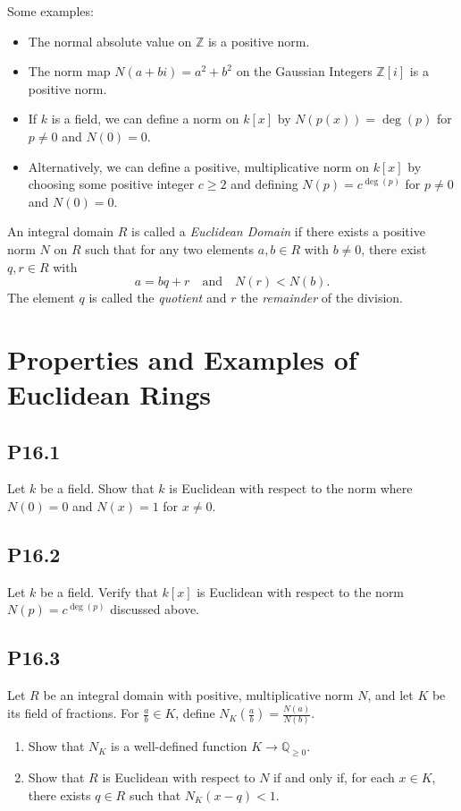 \documentclass[lang=cn,11pt]{template}
\begin{document}
Some examples:
\begin{itemize}
    \item The normal absolute value on \( \mathbb{Z} \) is a positive norm.
    \item The norm map \( N(a + bi) = a^2 + b^2 \) on the Gaussian Integers \( \mathbb{Z}[i] \) is a positive norm.
    \item If \( k \) is a field, we can define a norm on \( k[x] \) by \( N(p(x)) = \deg(p) \) for \( p \neq 0 \) and \( N(0) = 0 \).
    \item Alternatively, we can define a positive, multiplicative norm on \( k[x] \) by choosing some positive integer \( c \geq 2 \) and defining \( N(p) = c^{\deg(p)} \) for \( p \neq 0 \) and \( N(0) = 0 \).
\end{itemize}

\begin{definition}
An integral domain \( R \) is called a \textit{Euclidean Domain} if there exists a positive norm \( N \) on \( R \) such that for any two elements \( a, b \in R \) with \( b \neq 0 \), there exist \( q, r \in R \) with
\[
a = bq + r \quad \text{and} \quad N(r) < N(b).
\]
The element \( q \) is called the \textit{quotient} and \( r \) the \textit{remainder} of the division.
\end{definition}

\section{Properties and Examples of Euclidean Rings}

\subsection*{P16.1} Let \( k \) be a field. Show that \( k \) is Euclidean with respect to the norm where \( N(0) = 0 \) and \( N(x) = 1 \) for \( x \neq 0 \).

\subsection*{P16.2} Let \( k \) be a field. Verify that \( k[x] \) is Euclidean with respect to the norm \( N(p) = c^{\deg(p)} \) discussed above.

\subsection*{P16.3} Let \( R \) be an integral domain with positive, multiplicative norm \( N \), and let \( K \) be its field of fractions. For \( \frac{a}{b} \in K \), define \( N_K\left(\frac{a}{b}\right) = \frac{N(a)}{N(b)} \).
\begin{enumerate}
    \item Show that \( N_K \) is a well-defined function \( K \to \mathbb{Q}_{\geq 0} \).
    \item Show that \( R \) is Euclidean with respect to \( N \) if and only if, for each \( x \in K \), there exists \( q \in R \) such that \( N_K(x - q) < 1 \).
\end{enumerate}
\end{document}
